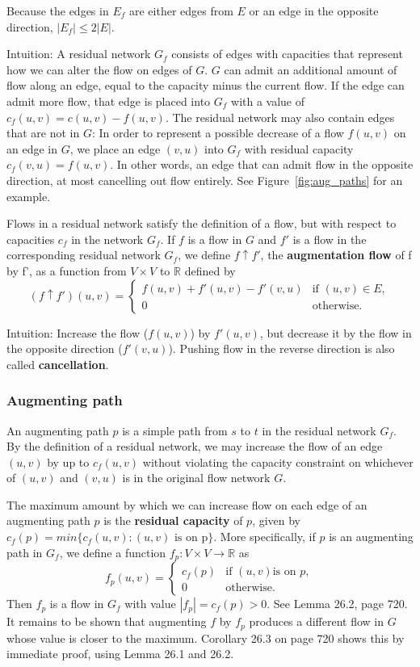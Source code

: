 Because the edges in $E_f$ are either edges from $E$ or an edge in the opposite direction,
$|E_f| \leq 2|E|$.

Intuition: A residual network $G_f$ consists of edges with capacities that
represent how we can alter the flow on edges of $G$. $G$ can admit an
additional amount of flow along an edge, equal to the capacity minus the
current flow. If the edge can admit more flow, that edge is placed into $G_f$
with a value of $c_f(u,v) = c(u,v) - f(u,v)$. The residual network may also
contain edges that are not in $G$: In order to represent a possible decrease
of a flow $f(u,v)$ on an edge in $G$, we place an edge $(v,u)$ into $G_f$ with
residual capacity $c_f(v,u) = f(u,v)$. In other words, an edge that can admit
flow in the opposite direction, at most cancelling out flow entirely. See
Figure~\ref{fig:aug_paths} for an example.

Flows in a residual network satisfy the definition of a flow, but with respect to capacities
$c_f$ in the network $G_f$. If $f$ is a flow in $G$ and $f'$ is a flow in the corresponding residual
network $G_f$, we define $f \uparrow f'$, the \textbf{augmentation flow} of f by f', as a function
from $V \times V$ to $\mathbb{R}$ defined by
\[
  (f \uparrow f')(u,v) =
  \begin{cases}
  	f(u,v) + f'(u,v) - f'(v,u) & \text{if } (u,v) \in E, \\
  	0 & \text{otherwise.}
  \end{cases}
\]

Intuition: Increase the flow ($f(u,v)$) by $f'(u,v)$, but decrease it by the flow in the
opposite direction ($f'(v,u)$). Pushing flow in the reverse direction is also called \textbf{cancellation}.

\subsubsection{Augmenting path}
An augmenting path $p$ is a simple path from $s$ to $t$ in the residual network $G_f$. By the definition
of a residual network, we may increase the flow of an edge $(u,v)$ by up to $c_f(u,v)$ without violating the
capacity constraint on whichever of $(u,v)$ and $(v,u)$ is in the original flow network $G$.

The maximum amount by which we can increase flow on each edge of an augmenting path $p$ is the
\textbf{residual capacity} of $p$, given by $c_f(p) = min\{c_f(u,v) : (u,v) \text{ is on p}\}$. More specifically,
if $p$ is an augmenting path in $G_f$, we define a function $f_p : V \times V \rightarrow \mathbb{R}$ as
\[
	f_p(u,v) =
	\begin{cases}
		c_f(p) & \text{if } (u,v) \text{is on } p, \\
		0 & \text{otherwise}.
	\end{cases}
\]
Then $f_p$ is a flow in $G_f$ with value $|f_p| = c_f(p) > 0$. See Lemma 26.2, page 720. It remains to be
shown that augmenting $f$ by $f_p$ produces a different flow in $G$ whose value is closer to the maximum.
Corollary 26.3 on page 720 shows this by immediate proof, using Lemma 26.1 and 26.2.

